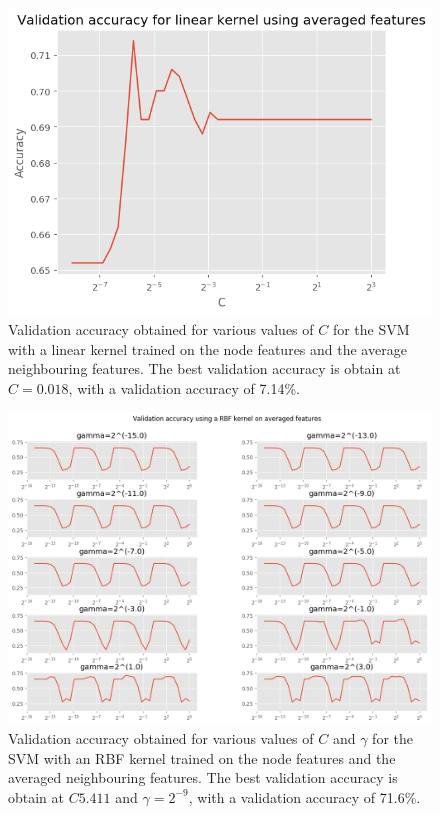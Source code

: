 \documentclass[12pt]{article}
\theoremstyle{definition}
\begin{document}
\begin{figure}[h]
	\includegraphics[width=1.0\textwidth]{average_svm/linear_reg}
	\centering
	\caption{Validation accuracy obtained for various values of $C$ for the SVM with a linear kernel trained on the node features and the average neighbouring features. The best validation accuracy is obtain at $C=0.018$, with a validation accuracy of 7.14\%.}
	\label{fig/average_svm_linear_reg}
\end{figure}
\begin{figure}[h]
	\includegraphics[width=1.0\textwidth]{average_svm/rbf_reg}
	\centering
	\caption{Validation accuracy obtained for various values of $C$ and $\gamma$ for the SVM with an RBF kernel trained on the node features and the averaged neighbouring features. The best validation accuracy is obtain at $C5.411$ and $\gamma=2^{-9}$, with a validation accuracy of 71.6\%.}
	\label{fig/average_svm_rbf_reg}
\end{figure}
\end{document}
